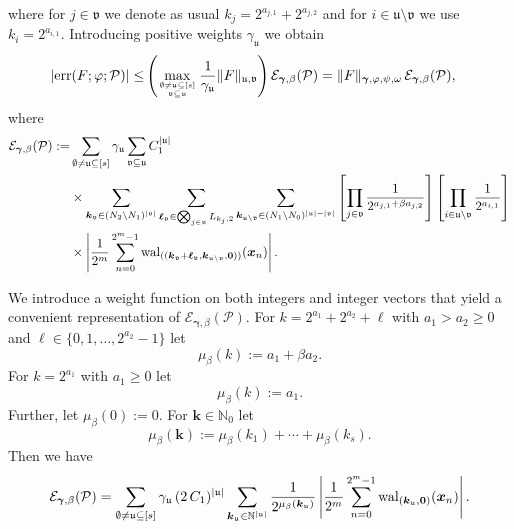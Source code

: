 \documentclass[namedate,webpdf,imanum]{ima-authoring-arxiv}%
\theoremstyle{thmstyletwo}%
\numberwithin{equation}{section}
\newcommand{\wal}{{\rm wal}}
\newcommand{\bsx}{\boldsymbol{x}}
\newcommand{\bsk}{\boldsymbol{k}}
\newcommand{\bsell}{\boldsymbol{\ell}}
\newcommand{\bsgamma}{\boldsymbol{\gamma}}
\newcommand{\bszero}{\boldsymbol{0}}
\newcommand{\uu}{\mathfrak{u}}
\newcommand{\vv}{\mathfrak{v}}
\newcommand{\cP}{\mathcal{P}}
\begin{document}
where for $j \in \vv$ we denote as usual $k_j =2^{a_{j,1}}+2^{a_{j,2}}$ and for $i \in \uu \setminus \vv$ we use $k_i=2^{a_{i,1}}$.
%
Introducing positive weights $\gamma_\uu$ we obtain
\begin{align*}
|{\rm err}(F;\varphi;\cP)| \le & \left(\max_{\emptyset \not= \uu \subseteq [s]\atop \vv \subseteq \uu} \frac{1}{\gamma_{\uu}}\|F\|_{\uu, \vv}\right) \mathcal{E}_{\bsgamma,\beta}(\cP) = \|F\|_{\bsgamma,\varphi,\psi,\omega} \, \mathcal{E}_{\bsgamma,\beta}(\cP),
\end{align*} 
where
\begin{align*}
\mathcal{E}_{\bsgamma,\beta}(\cP) := & \sum_{\emptyset \not= \uu \subseteq [s]} \gamma_{\uu} \sum_{\vv \subseteq \uu} C_1^{|\uu|} \\
& \times \sum_{\bsk_\vv \in (N_2 \setminus N_1)^{|\vv|}} \sum_{\bsell_\vv \in \bigotimes_{j\in \vv} L_{k_j,2}} \sum_{\bsk_{\uu \setminus \vv} \in (N_1 \setminus N_0)^{|\uu|-|\vv|}}
\left[\prod_{j \in \vv}  \frac{1}{2^{a_{j,1} + \beta a_{j,2}}}\right] \left[ \prod_{i \in \uu \setminus \vv} \frac{1}{2^{a_{i,1}}}\right] \\
& \times \left|\frac{1}{2^m} \sum_{n=0}^{2^m-1} \wal_{((\bsk_\vv+\bsell_\vv,\bsk_{\uu \setminus \vv},\bszero))}(\bsx_n)\right|.    
\end{align*}

We introduce a weight function on both integers and integer vectors that yield a convenient representation of $\mathcal{E}_{\bsgamma,\beta}(\cP)$. For $k = 2^{a_1} + 2^{a_2} + \ell$ with $a_1 > a_2 \ge 0$ and $\ell \in \{0,1,\ldots, 2^{a_2}-1\}$ let
\begin{equation*}
\mu_{\beta}(k) := a_1 + \beta a_2.
\end{equation*}
For $k = 2^{a_1}$ with $a_1 \ge 0$ let
\begin{equation*}
\mu_{\beta}(k) := a_1.
\end{equation*}
Further, let $\mu_{\beta}(0) := 0$. For $\bsk \in \mathbb{N}_0$ let
\begin{equation*}
\mu_{\beta}(\bsk) := \mu_{\beta}(k_1) + \cdots + \mu_{\beta}(k_s).
\end{equation*}
Then we have
\begin{align}\label{def:calE}
\mathcal{E}_{\bsgamma,\beta}(\cP) =  \sum_{\emptyset \not= \uu \subseteq [s]} \gamma_{\uu} \, (2 \,C_1)^{|\uu|} \sum_{\bsk_\uu \in \mathbb{N}^{|\uu|}} \frac{1}{2^{\mu_{\beta}(\bsk_{\uu})}}  \left|\frac{1}{2^m} \sum_{n=0}^{2^m-1} \wal_{(\bsk_\uu,\bszero)}(\bsx_n)\right|.    
\end{align}
\end{document}
